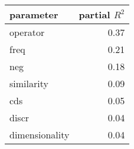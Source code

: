 \begin{tabular}{lr}
\toprule
      parameter &  partial $R^2$ \\
\midrule
       operator &  0.37 \\
           freq &  0.21 \\
            neg &  0.18 \\
     similarity &  0.09 \\
            cds &  0.05 \\
          discr &  0.04 \\
 dimensionality &  0.04 \\
\bottomrule
\end{tabular}
